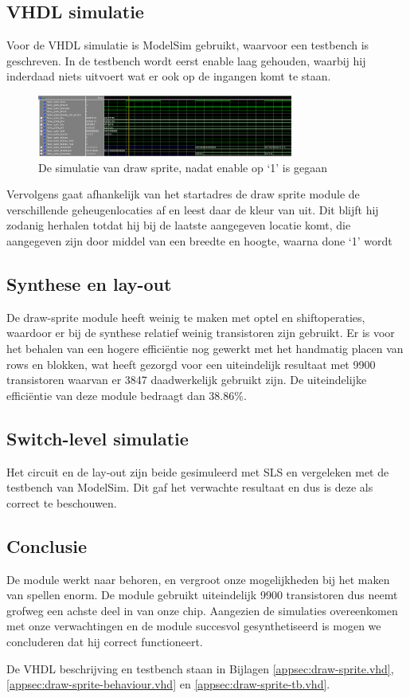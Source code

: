 \documentclass{scrartcl} %
\begin{document}
\subsection{VHDL simulatie}
Voor de VHDL simulatie is ModelSim gebruikt, waarvoor een testbench is geschreven. In de testbench wordt eerst enable laag gehouden, waarbij hij inderdaad niets uitvoert wat er ook op de ingangen komt te staan.\\
\begin{figure}[H]
	\centering
	\includegraphics[width=0.75\textwidth]{resource/draw_sprite_simulate.png}
	\caption{De simulatie van draw sprite, nadat enable op `1' is gegaan}
	\label{fig:draw-sprite-simulatie}
\end{figure}
Vervolgens gaat afhankelijk van het startadres de draw sprite module de verschillende geheugenlocaties af en leest daar de kleur van uit. Dit blijft hij zodanig herhalen totdat hij bij de laatste aangegeven locatie komt, die aangegeven zijn door middel van een breedte en hoogte, waarna done `1' wordt

\subsection{Synthese en lay-out}
De draw-sprite module heeft weinig te maken met optel en shiftoperaties, waardoor er bij de synthese relatief weinig transistoren zijn gebruikt. Er is voor het behalen van een hogere efficiëntie nog gewerkt met het handmatig placen van rows en blokken, wat heeft gezorgd voor een uiteindelijk resultaat met 9900 transistoren waarvan er 3847 daadwerkelijk gebruikt zijn. De uiteindelijke efficiëntie van deze module bedraagt dan 38.86\%.

\subsection{Switch-level simulatie}
Het circuit en de lay-out zijn beide gesimuleerd met SLS en vergeleken met de testbench van ModelSim. Dit gaf het verwachte resultaat en dus is deze als correct te beschouwen.

\subsection{Conclusie}
De module werkt naar behoren, en vergroot onze mogelijkheden bij het maken van spellen enorm. De module gebruikt uiteindelijk 9900 transistoren dus neemt grofweg een achste deel in van onze chip. Aangezien de simulaties overeenkomen met onze verwachtingen en de module succesvol gesynthetiseerd is mogen we concluderen dat hij correct functioneert.

De VHDL beschrijving en testbench staan in Bijlagen \ref{appsec:draw-sprite.vhd}, \ref{appsec:draw-sprite-behaviour.vhd} en \ref{appsec:draw-sprite-tb.vhd}.
\end{document}
